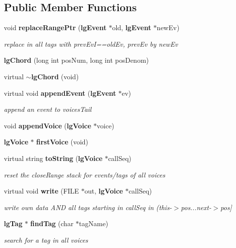 \subsection*{Public Member Functions}
\begin{CompactItemize}
\item 
void {\bf replace\-Range\-Ptr} ({\bf lg\-Event} $\ast$old, {\bf lg\-Event} $\ast$new\-Ev)
\begin{CompactList}\small\item\em replace in all tags with prev\-Ev\-I==old\-Ev, prev\-Ev by new\-Ev \item\end{CompactList}\item 
{\bf lg\-Chord} (long int pos\-Num, long int pos\-Denom)
\item 
virtual {\bf $\sim$lg\-Chord} (void)
\item 
virtual void {\bf append\-Event} ({\bf lg\-Event} $\ast$ev)
\begin{CompactList}\small\item\em append an event to voices\-Tail \item\end{CompactList}\item 
void {\bf append\-Voice} ({\bf lg\-Voice} $\ast$voice)
\item 
{\bf lg\-Voice} $\ast$ {\bf first\-Voice} (void)
\item 
virtual string {\bf to\-String} ({\bf lg\-Voice} $\ast$call\-Seq)
\begin{CompactList}\small\item\em reset the close\-Range stack for events/tags of all voices \item\end{CompactList}\item 
virtual void {\bf write} (FILE $\ast$out, {\bf lg\-Voice} $\ast$call\-Seq)
\begin{CompactList}\small\item\em write own data AND all tags starting in call\-Seq in (this-$>$pos...next-$>$pos] \item\end{CompactList}\item 
{\bf lg\-Tag} $\ast$ {\bf find\-Tag} (char $\ast$tag\-Name)
\begin{CompactList}\small\item\em search for a tag in all voices \item\end{CompactList}\item 

\end{CompactItemize}
